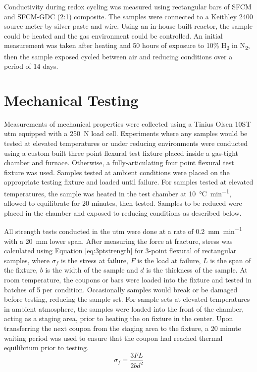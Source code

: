     Conductivity during redox cycling was measured using rectangular bars of SFCM and SFCM-GDC (2:1) composite.
    The samples were connected to a Keithley 2400 source meter by silver paste and wire.
    Using an in-house built reactor, the sample could be heated and the gas environment could be controlled.
    An initial measurement was taken after heating and 50 hours of exposure to 10\% H\textsubscript{2} in N\textsubscript{2}, then the sample exposed cycled between air and reducing conditions over a period of 14 days.

\section{Mechanical Testing}
    Measurements of mechanical properties were collected using a Tinius Olsen 10ST \gls{utm} equipped with a \SI{250}{N} load cell.
    Experiments where any samples would be tested at elevated temperatures or under reducing environments were conducted using a custom built three point flexural test fixture placed inside a gas-tight chamber and furnace.
    Otherwise, a fully-articulating four point flexural test fixture was used.
    Samples tested at ambient conditions were placed on the appropriate testing fixture and loaded until failure.
    For samples tested at elevated temperatures, the sample was heated in the test chamber at \SI{10}{\celsius\per\minute}, allowed to equilibrate for 20 minutes, then tested.
    Samples to be reduced were placed in the chamber and exposed to reducing conditions as described below.


    All strength tests conducted in the \gls{utm} were done at a rate of \SI{0.2}{\milli\meter\per\minute} with a \SI{20}{\milli\meter} lower span.
    After measuring the force at fracture, stress was calculated using Equation \ref{eq:3ptstrength}
    for 3-point flexural of rectangular samples, where \(\sigma_{f}\) is the stress at failure, $F$ is the load at failure, $L$ is the span of the fixture, $b$ is the width of the sample and $d$ is the thickness of the sample.
    At room temperature, the coupons or bars were loaded into the fixture and tested in batches of 5 per condition.
    Occasionally samples would break or be damaged before testing, reducing the sample set.
    For sample sets at elevated temperatures in ambient atmosphere, the samples were loaded into the front of the chamber, acting as a staging area,
    prior to heating the on fixture in the center.
    Upon transferring the next coupon from the staging area to the fixture, a 20 minute waiting period was used to ensure that the coupon had reached thermal equilibrium prior to testing.
    \begin{equation}
        \sigma_{f} = \frac{3FL}{2bd^{2}}
        \label{eq:3ptstrength}
    \end{equation}

